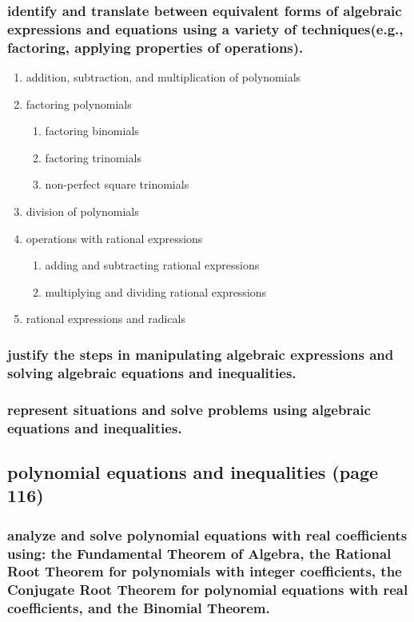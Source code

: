 \documentclass[11pt]{article}
\begin{document}
\subsubsection{identify and translate between equivalent forms of algebraic expressions and equations using a variety of techniques(e.g., factoring, applying properties of operations).}
\label{sec:org099e733}
\begin{enumerate}
\item addition, subtraction, and multiplication of polynomials
\label{sec:org4a02e9e}
\item factoring polynomials
\label{sec:org0468532}
\begin{enumerate}
\item factoring binomials
\label{sec:org2b8e51c}
\item factoring trinomials
\label{sec:org6824161}
\item non-perfect square trinomials
\label{sec:org5e039e4}
\end{enumerate}
\item division of polynomials
\label{sec:org796ceb6}
\item operations with rational expressions
\label{sec:org879f4b3}
\begin{enumerate}
\item adding and subtracting rational expressions
\label{sec:org7467f2c}
\item multiplying and dividing rational expressions
\label{sec:orgf4ca58c}
\end{enumerate}
\item rational expressions and radicals
\label{sec:org31ebad2}
\end{enumerate}
\subsubsection{justify the steps in manipulating algebraic expressions and solving algebraic equations and inequalities.}
\label{sec:org29607b6}
\subsubsection{represent situations and solve problems using algebraic equations and inequalities.}
\label{sec:org2d90df3}
\subsection{polynomial equations and inequalities (page 116)}
\label{sec:orgfb12b71}
\subsubsection{analyze and solve polynomial equations with real coefficients using: the Fundamental Theorem of Algebra, the Rational Root Theorem for polynomials with integer coefficients, the Conjugate Root Theorem for polynomial equations with real coefficients, and the Binomial Theorem.}
\label{sec:org9767251}
\end{document}
